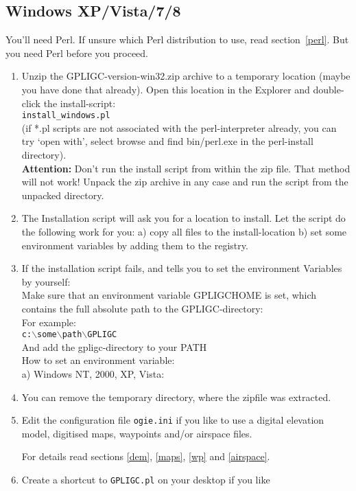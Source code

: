 \subsection{Windows XP/Vista/7/8}
\label{windows_install}
You'll need Perl. If unsure which Perl distribution to use, read section~\ref{perl}. But you need Perl before you proceed.

\begin{enumerate}
\item Unzip the GPLIGC-version-win32.zip archive to a temporary location
(maybe you have done that already).
Open this location in the Explorer and double-click the install-script: \\
\texttt{install\_windows.pl} \\
(if *.pl scripts are not associated with the perl-interpreter already,
you can try `open with', select browse and find bin/perl.exe in the
perl-install directory).\\
\textbf{Attention:} Don't run the install script from within the zip file. That method will not work!
Unpack the zip archive in any case and run the script from the unpacked directory.

\item The Installation script will ask you for a location to install.
Let the script do the following work for you:
a) copy all files to the install-location
b) set some environment variables by adding them to the registry.

\item If the installation script fails, and tells you to set the environment Variables
by yourself:\\
Make sure that an environment variable GPLIGCHOME is set,
which contains the full absolute path to the GPLIGC-directory:\\
For example: \\
\texttt{c:$\backslash$some$\backslash$path$\backslash$GPLIGC} \\
And add the gpligc-directory to your PATH \\
How to set an environment variable: \\
a) Windows NT, 2000, XP, Vista: \\

\item You can remove the temporary directory, where the zipfile was extracted.

\item Edit the configuration file \texttt{ogie.ini} if you like to use a digital
elevation model, digitised maps, waypoints and/or airspace files.

For details read sections \ref{dem}, \ref{maps}, \ref{wp} and \ref{airspace}.

\item Create a shortcut to \texttt{GPLIGC.pl} on your desktop if you like

\end{enumerate}


